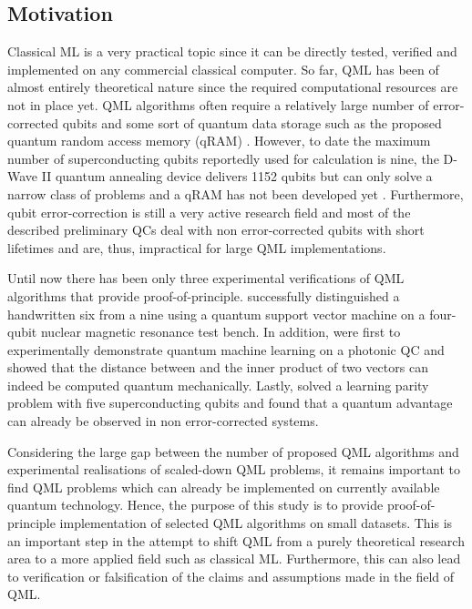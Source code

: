 \documentclass[a4paper]{article}
\newcommand*{\0}{$\ket{0}$}
\newcommand*{\1}{$\ket{1}$}
\begin{document}
\newpage

\subsection{Motivation}
\label{subsec:motivation}

Classical ML is a very practical topic since it can be directly tested, verified and implemented on any commercial classical computer. So far, QML has been of almost entirely theoretical nature since the required computational resources are not in place yet. QML algorithms often require a relatively large number of error-corrected qubits and some sort of quantum data storage such as the proposed quantum random access memory (qRAM) \citep{qRAM}. However, to date the maximum number of superconducting qubits reportedly used for calculation is nine, the D-Wave II quantum annealing device delivers 1152 qubits but can only solve a narrow class of problems and a qRAM has not been developed yet \citep{hydrogensimulation, dwave2}. Furthermore, qubit error-correction is still a very active research field and most of the described preliminary QCs deal with non error-corrected qubits with short lifetimes and are, thus, impractical for large QML implementations.

Until now there has been only three experimental verifications of QML algorithms that provide proof-of-principle. \cite{Li2015} successfully distinguished a handwritten six from a nine using a quantum support vector machine on a four-qubit nuclear magnetic resonance test bench. In addition, \cite{Cai2015} were first to experimentally demonstrate quantum machine learning on a photonic QC and showed that the distance between and the inner product of two vectors can indeed be computed quantum mechanically. Lastly, \cite{Riste2015} solved a learning parity problem with five superconducting qubits and found that a quantum advantage can already be observed in non error-corrected systems.

Considering the large gap between the number of proposed QML algorithms and experimental realisations of scaled-down QML problems, it remains important to find QML problems which can already be implemented on currently available quantum technology. Hence, the purpose of this study is to provide proof-of-principle implementation of selected QML algorithms on small datasets. This is an important step in the attempt to shift QML from a purely theoretical research area to a more applied field such as classical ML. Furthermore, this can also lead to verification or falsification of the claims and assumptions made in the field of QML. 
\end{document}
